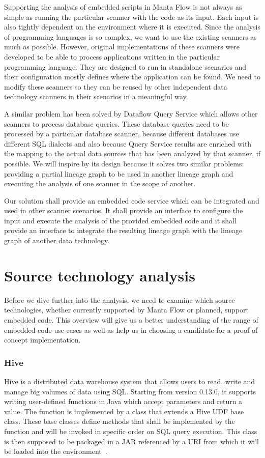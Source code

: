 Supporting the analysis of embedded scripts in Manta Flow is not always as simple as running the particular scanner with the code as its input. Each input is also tightly dependent on the environment where it is executed. Since the analysis of programming languages is so complex, we want to use the existing scanners as much as possible. However, original implementations of these scanners were developed to be able to process applications written in the particular programming language. They are designed to run in standalone scenarios and their configuration mostly defines where the application can be found. We need to modify these scanners so they can be reused by other independent data technology scanners in their scenarios in a meaningful way.
\par %
A similar problem has been solved by Dataflow Query Service which allows other scanners to process database queries. These database queries need to be processed by a particular database scanner, because different databases use different SQL dialects and also because Query Service results are enriched with the mapping to the actual data sources that has been analyzed by that scanner, if possible. We will inspire by its design because it solves two similar problems: providing a partial lineage graph to be used in another lineage graph and executing the analysis of one scanner in the scope of another.
\par %
Our solution shall provide an embedded code service which can be integrated and used in other scanner scenarios. It shall provide an interface to configure the input and execute the analysis of the provided embedded code and it shall provide an interface to integrate the resulting lineage graph with the lineage graph of another data technology.

\section{Source technology analysis}

Before we dive further into the analysis, we need to examine which source technologies, whether currently supported by Manta Flow or planned, support embedded code. This overview will give us a better understanding of the range of embedded code use-cases as well as help us in choosing a candidate for a proof-of-concept implementation.

\subsubsection{Hive}
Hive is a distributed data warehouse system that allows users to read, write and manage big volumes of data using SQL. Starting from version 0.13.0, it supports writing user-defined functions in Java which accept parameters and return a value. The function is implemented by a class that extends a Hive UDF base class. These base classes define methods that shall be implemented by the function and will be invoked in specific order on SQL query execution. This class is then supposed to be packaged in a JAR referenced by a URI from which it will be loaded into the environment~\cite{hive}.

